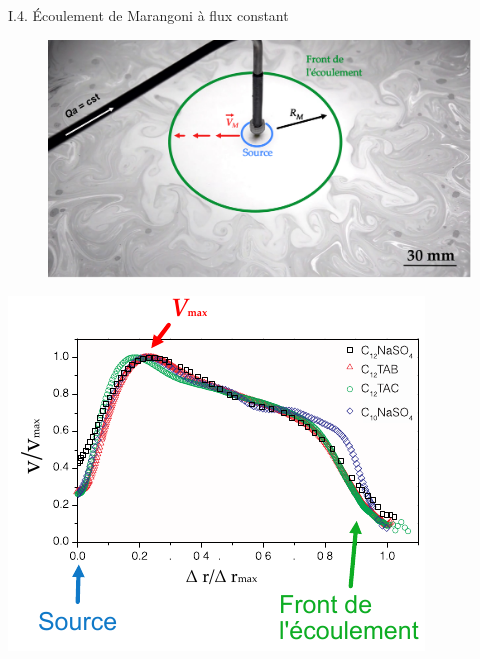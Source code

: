 \documentclass[aspectratio=169,10pt]{beamer}
\begin{document}
    
    

    \begin{frame}{I.4. Écoulement de Marangoni à flux constant}
      \begin{minipage}{.45\textwidth}
        \begin{figure}
          \centering
          \includegraphics[width=1.1\textwidth]{./figures/Ecoulement_Marangoni_2.pdf}
        \end{figure}
      \end{minipage}\hfill
        \begin{minipage}{.45\textwidth}
          \centering
          \includegraphics[scale=.8]{./figures/profil_vitesse_matthieu.pdf}
        \end{minipage}
    \end{frame}
    
\end{document}
